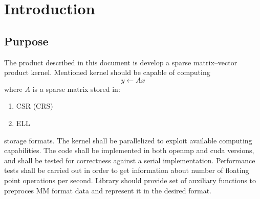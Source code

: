 \chapter{Introduction}\label{chp:introduction}

\section{Purpose} \label{s:introduction:purpose}
	\begin{comment}
	$<$Identify the product whose software requirements are specified in this 
	document, including the revision or release number. Describe the scope of the 
	product that is covered by this SRS, particularly if this SRS describes only 
	part of the system or a single subsystem.$>$
	\end{comment}
	The product described in this document is develop a sparse matrix--vector product kernel. Mentioned kernel should be capable of computing
	\begin{equation}
	y \leftarrow Ax
	\end{equation}
	where $A$ is a sparse matrix stored in:
	\begin{enumerate}
		\item \gls{CSR} (\gls{CRS})
		\item \gls{ELL}
	\end{enumerate}
	storage formats. The kernel shall be parallelized to exploit available computing capabilities. The code shall be implemented in both \gls{openmp} and \gls{cuda} versions, and shall be tested for correctness against a serial implementation. Performance tests shall be carried out in order to get information about number of floating point operations per second. Library should provide set of auxiliary functions to preproces \gls{MM} format data and represent it in the desired format.
